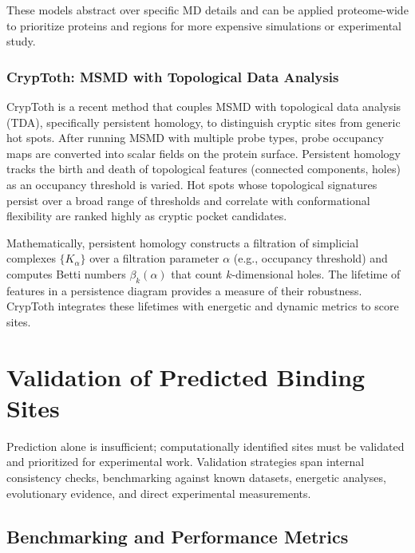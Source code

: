 \documentclass[12pt,a4paper]{article}
\begin{document}
These models abstract over specific MD details and can be applied proteome-wide to prioritize proteins and regions for more expensive simulations or experimental study.\cite{CH5_meller2023predicting,CH5_Gasparikova2025}

\subsubsection{CrypToth: MSMD with Topological Data Analysis}

CrypToth is a recent method that couples MSMD with topological data analysis (TDA), specifically persistent homology, to distinguish cryptic sites from generic hot spots.\cite{CH5_koseki2025cryptoth} After running MSMD with multiple probe types, probe occupancy maps are converted into scalar fields on the protein surface. Persistent homology tracks the birth and death of topological features (connected components, holes) as an occupancy threshold is varied. Hot spots whose topological signatures persist over a broad range of thresholds and correlate with conformational flexibility are ranked highly as cryptic pocket candidates.\cite{CH5_koseki2025cryptoth,CH5_Gasparikova2025}

Mathematically, persistent homology constructs a filtration of simplicial complexes \(\{K_\alpha\}\) over a filtration parameter \(\alpha\) (e.g., occupancy threshold) and computes Betti numbers \(\beta_k(\alpha)\) that count \(k\)-dimensional holes. The lifetime of features in a persistence diagram provides a measure of their robustness. CrypToth integrates these lifetimes with energetic and dynamic metrics to score sites.\cite{CH5_koseki2025cryptoth}

\section{Validation of Predicted Binding Sites}

Prediction alone is insufficient; computationally identified sites must be validated and prioritized for experimental work. Validation strategies span internal consistency checks, benchmarking against known datasets, energetic analyses, evolutionary evidence, and direct experimental measurements.

\subsection{Benchmarking and Performance Metrics}
\end{document}
